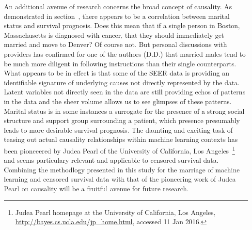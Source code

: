 \documentclass[10pt,letterpaper]{article}
\newcommand{\lorem}{{\bf LOREM}}
\newcommand{\ipsum}{{\bf IPSUM}}
\begin{document}
An additional avenue of research concerns the broad concept of causality. As demonstrated in section~, there appears to be a correlation between marital status and survival prognosis. Does this mean that if a single person in Boston, Massachusetts is diagnosed with cancer, that they should immediately get married and move to Denver? Of course not. 
But personal discussions with providers has confirmed for one of the authors (D.D.) that married males tend to be much more diligent in following instructions than their single counterparts. What appears to be in effect is that some of the SEER data is providing an identifiable signature of underlying causes not directly represented by the data. Latent variables not directly seen in the data are still providing echos of patterns in the data and the sheer volume allows us to see glimpses of these patterns. Marital status is in some instances a surrogate for the presence of a strong social structure and support group surrounding a patient, which presence presumably leads to more desirable survival prognosis. 
The daunting and exciting task of teasing out actual causality relationships within machine learning contexts has been pioneeered by Judea Pearl of the University of California, Los Angeles~\footnote{Judea Pearl homepage at the University of California, Los Angeles, \url{http://bayes.cs.ucla.edu/jp_home.html}, accessed 11 Jan 2016.} and seems particulary relevant and applicable to censored survival data. Combining the methodlogy presented in this study for the marriage of machine learning and censored survival data with that of the pioneering work of Judea Pearl on causality will be a fruitful avenue for future research.




\end{document}
